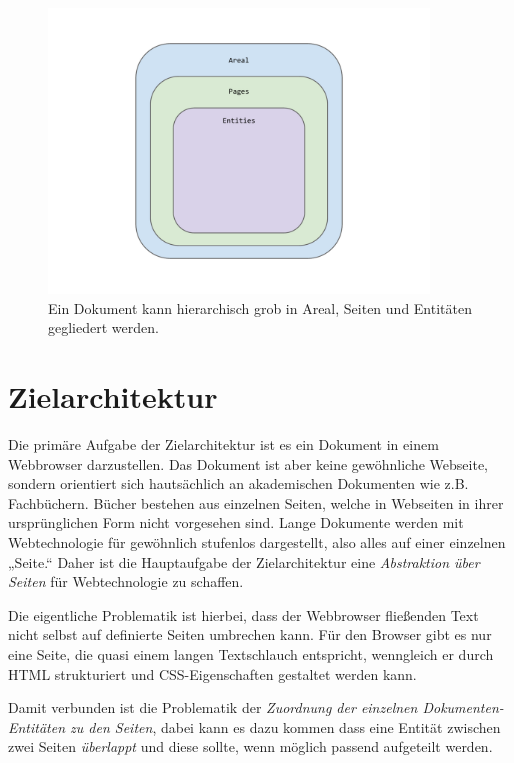 \begin{figure}[h!]
  \centering
    \includegraphics[width=0.9\textwidth]{figures/areal_pages_entities.pdf}
  \caption{Ein Dokument kann hierarchisch grob in Areal, Seiten und Entitäten gegliedert werden.}\label{fig-areal_pages_entities}
\end{figure}

\section{Zielarchitektur}\label{sec-zielarchitektur}

Die primäre Aufgabe der Zielarchitektur ist es ein Dokument in
einem Webbrowser darzustellen. Das Dokument ist aber keine gewöhnliche
Webseite, sondern orientiert sich hautsächlich an akademischen
Dokumenten wie z.B. Fachbüchern. Bücher bestehen aus einzelnen Seiten,
welche in Webseiten in ihrer ursprünglichen Form nicht vorgesehen sind.
Lange Dokumente werden mit Webtechnologie für gewöhnlich stufenlos
dargestellt, also alles auf einer einzelnen „Seite.“
Daher ist die Hauptaufgabe der Zielarchitektur eine \emph{Abstraktion
über Seiten} für Webtechnologie zu schaffen.

Die eigentliche Problematik ist hierbei, dass der Webbrowser fließenden
Text nicht selbst auf definierte Seiten umbrechen kann. Für den Browser
gibt es nur eine Seite, die quasi einem langen Textschlauch entspricht,
wenngleich er durch HTML strukturiert und
CSS-Eigenschaften gestaltet werden kann.

Damit verbunden ist die Problematik der
\emph{Zuordnung der einzelnen Dokumenten-Entitäten zu den Seiten},
dabei kann es dazu kommen dass eine Entität zwischen zwei Seiten
\emph{überlappt} und diese sollte, wenn möglich passend aufgeteilt werden.

